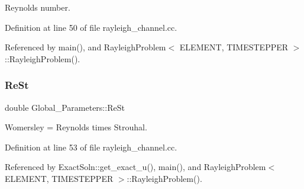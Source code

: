 Reynolds number. 



Definition at line 50 of file rayleigh\+\_\+channel.\+cc.



Referenced by main(), and Rayleigh\+Problem$<$ E\+L\+E\+M\+E\+N\+T, T\+I\+M\+E\+S\+T\+E\+P\+P\+E\+R $>$\+::\+Rayleigh\+Problem().

\mbox{\label{namespaceGlobal__Parameters_a7a59a32365e87566069e458dc83bd18a}} 
\subsubsection{\texorpdfstring{Re\+St}{ReSt}}
{\footnotesize\ttfamily double Global\+\_\+\+Parameters\+::\+Re\+St}



Womersley = Reynolds times Strouhal. 



Definition at line 53 of file rayleigh\+\_\+channel.\+cc.



Referenced by Exact\+Soln\+::get\+\_\+exact\+\_\+u(), main(), and Rayleigh\+Problem$<$ E\+L\+E\+M\+E\+N\+T, T\+I\+M\+E\+S\+T\+E\+P\+P\+E\+R $>$\+::\+Rayleigh\+Problem().

